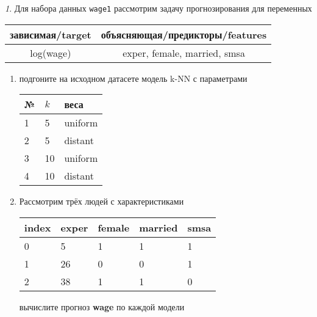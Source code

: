 \documentclass[12pt]{article}
\theoremstyle{remark}
\newtheorem{exercise}{}[section]
\begin{document}
\begin{exercise}
Для набора данных \texttt{wage1} рассмотрим задачу прогнозирования
для переменных
\begin{center}
	\begin{tabular}{|c|c|}\hline
		зависимая/target & объясняющая/предикторы/features \\ \hline
		log(wage) & exper, female, married, smsa \\ \hline
	\end{tabular}
\end{center}
\begin{enumerate}
	\item подгоните на исходном датасете модель k-NN с параметрами
	\begin{center}
		\begin{tabular}{|l|l|l|}\hline
		№ & \(k\) & веса \\ \hline
		1 & 5 & uniform \\
		2 & 5 & distant \\
		3 & 10 & uniform \\
		4 & 10 & distant \\ \hline
		\end{tabular}
	\end{center}
	\item Рассмотрим трёх людей с характеристиками
	\begin{center}
		\begin{tabular}{|l||l|l|l|l|}\hline
			index & exper & female & married & smsa \\ \hline\hline
			0 & 5 & 1 & 1 & 1  \\
			1 & 26 & 0 & 0 & 1 \\
			2 & 38 & 1 & 1 & 0 \\ \hline
		\end{tabular}
	\end{center}
	вычислите прогноз \textbf{wage} по каждой модели
\end{enumerate}
\end{exercise}
\end{document}

